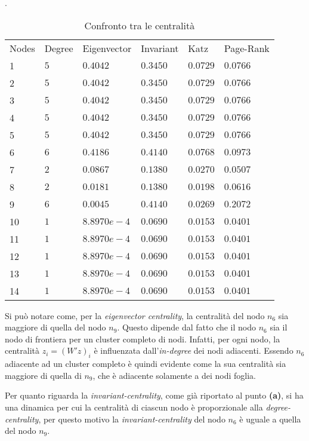 \begin{alphaparts}
\begin{table}[htb]
    \centering
    \caption{Confronto tra le centralità}.
    \begin{tabular}{llllll}
     Nodes & Degree & Eigenvector & Invariant & Katz & Page-Rank \\
    1 & $5$ & $0.4042$ & $0.3450$ & $0.0729$ & $0.0766$\\
    2 & $5$ & $0.4042$ & $0.3450$ & $0.0729$ & $0.0766$\\
    3 & $5$ & $0.4042$ & $0.3450$ & $0.0729$ & $0.0766$\\
    4 & $5$ & $0.4042$ & $0.3450$ & $0.0729$ & $0.0766$\\
    5 & $5$ & $0.4042$ & $0.3450$ & $0.0729$ & $0.0766$\\
    6 & $6$ & $0.4186$ & $0.4140$ & $0.0768$ & $0.0973$\\
    7 & $2$ & $0.0867$ & $0.1380$ & $0.0270$ & $0.0507$\\
    8 & $2$ & $0.0181$ & $0.1380$ & $0.0198$ & $0.0616$\\
    9 & $6$ & $0.0045$ & $0.4140$ & $0.0269$ & $0.2072$\\
    10 & $1$ & $8.8970e-4$ & $0.0690$ & $0.0153$ & $0.0401$\\
    11 & $1$ & $8.8970e-4$ & $0.0690$ & $0.0153$ & $0.0401$\\
    12 & $1$ & $8.8970e-4$ & $0.0690$ & $0.0153$ & $0.0401$\\
    13 & $1$ & $8.8970e-4$ & $0.0690$ & $0.0153$ & $0.0401$\\
    14 & $1$ & $8.8970e-4$ & $0.0690$ & $0.0153$ & $0.0401$\\
    \end{tabular}
 \end{table}
    
    
    Si può notare come, per la \textit{eigenvector centrality}, la centralità del nodo \(n_6\) sia maggiore di quella del nodo \(n_9\). Questo dipende dal fatto che il nodo \(n_6\) sia il nodo di frontiera per un cluster completo di nodi. Infatti, per ogni nodo, la centralità \(z_i= (W'z)_i\) è influenzata dall'\textit{in-degree} dei nodi adiacenti. Essendo \(n_6\) adiacente ad un cluster completo è quindi evidente come la sua centralità sia maggiore di quella di \(n_9\), che è adiacente solamente a dei nodi foglia. 
    
    Per quanto riguarda la \textit{invariant-centrality}, come già riportato al punto \textbf{(a)}, si ha una dinamica per cui la centralità di ciascun nodo è proporzionale alla \textit{degree-centrality}, per questo motivo la \textit{invariant-centrality} del nodo \(n_6\) è uguale a quella del nodo \(n_9\).
    

\end{alphaparts}
